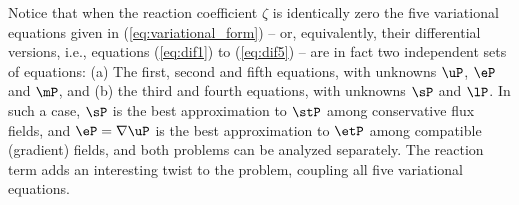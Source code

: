 \begin{remark}
	Notice that when the reaction coefficient $\zeta$ is identically zero the five variational equations given in (\ref{eq:variational_form}) -- or, equivalently, their differential versions, i.e., equations (\ref{eq:dif1}) to (\ref{eq:dif5}) -- are in fact two independent sets of equations: (a) The first, second and fifth equations, with unknowns $\uP$, $\eP$ and $\mP$, and (b) the third and fourth equations, with unknowns $\sP$ and $\lP$. In such a case, $\sP$ is the best approximation to $\stP$ among conservative flux fields, and $\eP=\nabla \uP$ is the best approximation to $\etP$ among compatible (gradient) fields, and both problems can be analyzed separately. The reaction term adds an interesting twist to the problem, coupling all five variational equations.	
\end{remark}

